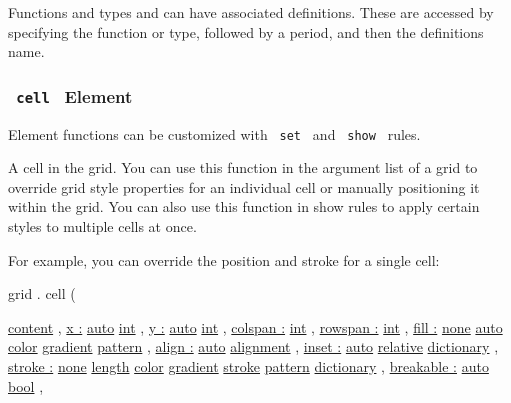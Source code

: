 \label{definitions-tooltip}
Functions and types and can have associated definitions. These are
accessed by specifying the function or type, followed by a period, and
then the definition\textquotesingle s name.

\subsubsection{\texorpdfstring{\texttt{\ cell\ } {{ Element
}}}{ cell   Element }}\label{definitions-cell}

\label{definitions-cell-element-tooltip}
Element functions can be customized with \texttt{\ set\ } and
\texttt{\ show\ } rules.

A cell in the grid. You can use this function in the argument list of a
grid to override grid style properties for an individual cell or
manually positioning it within the grid. You can also use this function
in show rules to apply certain styles to multiple cells at once.

For example, you can override the position and stroke for a single cell:

grid { . } { cell } (

{ \href{/docs/reference/foundations/content/}{content} , } {
\hyperref[definitions-cell-parameters-x]{x :}
\href{/docs/reference/foundations/auto/}{auto}
\href{/docs/reference/foundations/int/}{int} , } {
\hyperref[definitions-cell-parameters-y]{y :}
\href{/docs/reference/foundations/auto/}{auto}
\href{/docs/reference/foundations/int/}{int} , } {
\hyperref[definitions-cell-parameters-colspan]{colspan :}
\href{/docs/reference/foundations/int/}{int} , } {
\hyperref[definitions-cell-parameters-rowspan]{rowspan :}
\href{/docs/reference/foundations/int/}{int} , } {
\hyperref[definitions-cell-parameters-fill]{fill :}
\href{/docs/reference/foundations/none/}{none}
\href{/docs/reference/foundations/auto/}{auto}
\href{/docs/reference/visualize/color/}{color}
\href{/docs/reference/visualize/gradient/}{gradient}
\href{/docs/reference/visualize/pattern/}{pattern} , } {
\hyperref[definitions-cell-parameters-align]{align :}
\href{/docs/reference/foundations/auto/}{auto}
\href{/docs/reference/layout/alignment/}{alignment} , } {
\hyperref[definitions-cell-parameters-inset]{inset :}
\href{/docs/reference/foundations/auto/}{auto}
\href{/docs/reference/layout/relative/}{relative}
\href{/docs/reference/foundations/dictionary/}{dictionary} , } {
\hyperref[definitions-cell-parameters-stroke]{stroke :}
\href{/docs/reference/foundations/none/}{none}
\href{/docs/reference/layout/length/}{length}
\href{/docs/reference/visualize/color/}{color}
\href{/docs/reference/visualize/gradient/}{gradient}
\href{/docs/reference/visualize/stroke/}{stroke}
\href{/docs/reference/visualize/pattern/}{pattern}
\href{/docs/reference/foundations/dictionary/}{dictionary} , } {
\hyperref[definitions-cell-parameters-breakable]{breakable :}
\href{/docs/reference/foundations/auto/}{auto}
\href{/docs/reference/foundations/bool/}{bool} , }

